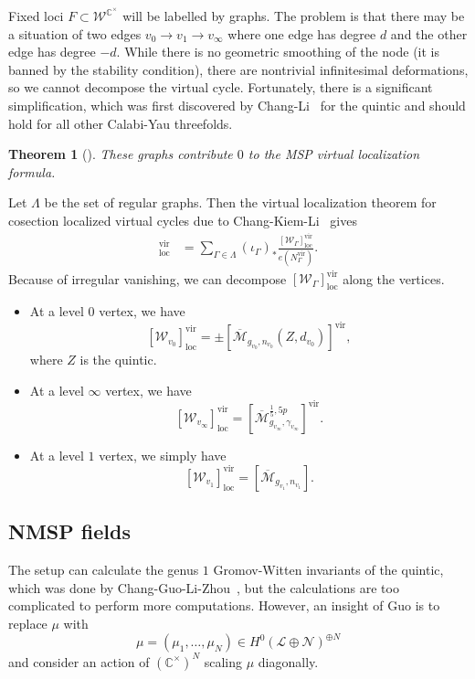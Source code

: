 \documentclass[10pt]{amsart}
\newtheorem{thm}{Theorem}[section]
\theoremstyle{definition}
\theoremstyle{remark}
\theoremstyle{plain}
\theoremstyle{definition}
\theoremstyle{remark}
\newcommand{\C}{\mathbb{C}}
\newcommand{\Mbar}{\overline{\mathcal{M}}}
\newcommand{\mc}[1]{\mathcal{#1}}
\newcommand{\mr}[1]{\mathrm{#1}}
\newcommand{\1}{\mathbf{1}}
\newcommand{\2}{\mathbf{2}}
\newcommand{\3}{\mathbf{3}}
\newcommand{\vir}{\mr{vir}}
\begin{document}
Fixed loci $F \subset \mc{W}^{\C^{\times}}$ will be labelled by graphs. The problem is that there may be a situation of two edges $v_0 \to v_1 \to v_{\infty}$ where one edge has degree $d$ and the other edge has degree $-d$. While there is no geometric smoothing of the node (it is banned by the stability condition), there are nontrivial infinitesimal deformations, so we cannot decompose the virtual cycle. Fortunately, there is a significant simplification, which was first discovered by Chang-Li~\cite{msp3} for the quintic and should hold for all other Calabi-Yau threefolds.

\begin{thm}[\cite{msp3}]
    These graphs contribute $0$ to the MSP virtual localization formula.
\end{thm}

Let $\Lambda$ be the set of regular graphs. Then the virtual localization theorem for cosection localized virtual cycles due to Chang-Kiem-Li~\cite{locwccosection} gives
\begin{align*}
    [\mc{W}]^{\vir}_{\mr{loc}} &= \sum_{\Gamma \in \Lambda} (\iota_{\Gamma})_* \frac{[\mc{W}_{\Gamma}]^{\vir}_{\mr{loc}}}{e(N_{\Gamma}^{\vir})}.
\end{align*}
Because of irregular vanishing, we can decompose $[\mc{W}_{\Gamma}]^{\vir}_{\mr{loc}}$ along the vertices.

\begin{itemize}
    \item At a level $0$ vertex, we have
        \[ [\mc{W}_{v_0}]_{\mr{loc}}^{\vir} = \pm [\Mbar_{g_{v_0}, n_{v_0}}(Z, d_{v_0})]^{\vir}, \]
        where $Z$ is the quintic.
    \item At a level $\infty$ vertex, we have
        \[ [\mc{W}_{v_{\infty}}]_{\mr{loc}}^{\vir} = [\Mbar_{g_{v_{\infty}}, \gamma_{v_{\infty}}}^{\frac{1}{5},5p}]^{\vir}. \]
    \item At a level $1$ vertex, we simply have
        \[ [\mc{W}_{v_1}]_{\mr{loc}}^{\vir} = [\Mbar_{g_{v_1}, n_{v_1}}]. \]
\end{itemize}


\subsection{NMSP fields}%
\label{sub:NMSP fields}

The setup can calculate the genus $1$ Gromov-Witten invariants of the quintic, which was done by Chang-Guo-Li-Zhou~\cite{genusonemsp}, but the calculations are too complicated to perform more computations. However, an insight of Guo is to replace $\mu$ with
\[ \mu = (\mu_1, \ldots, \mu_N) \in H^0(\mc{L}\oplus \mc{N})^{\oplus N} \]
and consider an action of $(\C^{\times})^N$ scaling $\mu$ diagonally.
\end{document}
